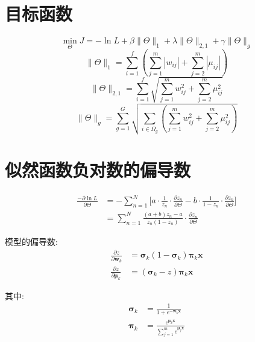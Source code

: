 \documentclass[UTF8,10pt, twoside]{article}
\begin{document}
\section{目标函数}
\begin{equation} 
\min\limits_{\Theta}J=-\ln L + \beta \|\Theta\|_{1} + \lambda  \|\Theta\|_{2,1} + \gamma \|\Theta\|_{g}  
\end{equation}
\begin{equation}
 \|\Theta\|_{1} = \sum_{i=1}^{f} \left(\sum_{j=1}^{m} |w_{ij}| +  \sum_{j=2}^{m} |\mu_{ij}| \right)  
\end{equation} 
\begin{equation} 
\|\Theta\|_{2,1} = \sum_{i=1}^{f} \sqrt{\sum_{j=1}^{m} w_{ij}^2 +  \sum_{j=2}^{m} \mu_{ij}^2  } 
\end{equation}
\begin{equation} 
  \|\Theta\|_{g} = \sum_{g=1}^{G} \sqrt{ \sum_{i\in\Omega_g}\left(\sum_{j=1}^{m} w_{ij}^2 +  \sum_{j=2}^{m} \mu_{ij}^2\right) } 
 \end{equation} 

\section{似然函数负对数的偏导数}
\begin{equation} 
\begin{aligned}   
	\frac{-\partial\ln L}{\partial \Theta}&=-\sum_{n=1}^N\Big[a\cdot\frac{1}{z_n}\cdot\frac{\partial z_n}{\partial \Theta} - b\cdot\frac{1}{1-z_n} \cdot\frac{\partial z_n}{\partial \Theta}\Big] \\
	&=\sum_{n=1}^N\frac{(a+b)z_n-a}{z_n(1-z_n)}\cdot\frac{\partial z_n}{\partial \Theta}
\end{aligned}
\end{equation}

模型的偏导数:
\begin{equation} 
\begin{aligned}   
	\frac{\partial z}{\partial \bm{w}_k} &= \bm{\sigma}_k(1-\bm{\sigma}_k)\bm{\pi}_k \bm{x} \\
	\frac{\partial z}{\partial \bm{\mu}_k} &= (\bm{\sigma}_k -z)\bm{\pi}_k \bm{x}
\end{aligned}
\end{equation}

其中:
\begin{equation} 
\begin{aligned}    
	\bm{\sigma}_k&=\frac{1}{1+e^{  \bm{-w}_k \bm{x}}}\\
	\bm{\pi}_k&=\frac{e^{\bm{\mu}_k\bm{x}}}{\sum\limits_{j=1}^m e^{\bm{\mu}_j\bm{x}}}
\end{aligned}
\end{equation} 
\end{document}
